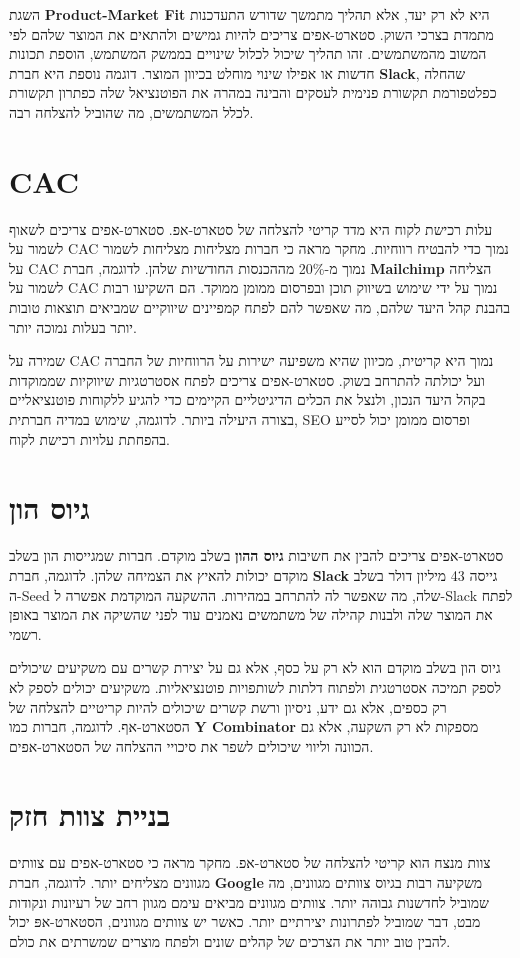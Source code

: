השגת \textbf{Product-Market Fit} היא לא רק יעד, אלא תהליך מתמשך שדורש התעדכנות מתמדת בצרכי השוק. סטארט-אפים צריכים להיות גמישים ולהתאים את המוצר שלהם לפי המשוב מהמשתמשים. זהו תהליך שיכול לכלול שינויים בממשק המשתמש, הוספת תכונות חדשות או אפילו שינוי מוחלט בכיוון המוצר. דוגמה נוספת היא חברת \textbf{Slack}, שהחלה כפלטפורמת תקשורת פנימית לעסקים והבינה במהרה את הפוטנציאל שלה כפתרון תקשורת לכלל המשתמשים, מה שהוביל להצלחה רבה.

\section{CAC \texorpdfstring{}{(Customer Acquisition Cost)}}
עלות רכישת לקוח  היא מדד קריטי להצלחה של סטארט-אפ. סטארט-אפים צריכים לשאוף לשמור על CAC נמוך כדי להבטיח רווחיות. מחקר מראה כי חברות מצליחות מצליחות לשמור על CAC נמוך מ-20\% מההכנסות החודשיות שלהן. לדוגמה, חברת \textbf{Mailchimp} הצליחה לשמור על CAC נמוך על ידי שימוש בשיווק תוכן ובפרסום ממומן ממוקד. הם השקיעו רבות בהבנת קהל היעד שלהם, מה שאפשר להם לפתח קמפיינים שיווקיים שמביאים תוצאות טובות יותר בעלות נמוכה יותר.

שמירה על CAC נמוך היא קריטית, מכיוון שהיא משפיעה ישירות על הרווחיות של החברה ועל יכולתה להתרחב בשוק. סטארט-אפים צריכים לפתח אסטרטגיות שיווקיות שממוקדות בקהל היעד הנכון, ולנצל את הכלים הדיגיטליים הקיימים כדי להגיע ללקוחות פוטנציאליים בצורה היעילה ביותר. לדוגמה, שימוש במדיה חברתית, SEO ופרסום ממומן יכול לסייע בהפחתת עלויות רכישת לקוח.

\section{גיוס הון}
סטארט-אפים צריכים להבין את חשיבות \textbf{גיוס ההון} בשלב מוקדם. חברות שמגייסות הון בשלב מוקדם יכולות להאיץ את הצמיחה שלהן. לדוגמה, חברת \textbf{Slack} גייסה 43 מיליון דולר בשלב ה-Seed שלה, מה שאפשר לה להתרחב במהירות. ההשקעה המוקדמת אפשרה ל-Slack לפתח את המוצר שלה ולבנות קהילה של משתמשים נאמנים עוד לפני שהשיקה את המוצר באופן רשמי.

גיוס הון בשלב מוקדם הוא לא רק על כסף, אלא גם על יצירת קשרים עם משקיעים שיכולים לספק תמיכה אסטרטגית ולפתוח דלתות לשותפויות פוטנציאליות. משקיעים יכולים לספק לא רק כספים, אלא גם ידע, ניסיון ורשת קשרים שיכולים להיות קריטיים להצלחה של הסטארט-אף. לדוגמה, חברות כמו \textbf{Y Combinator} מספקות לא רק השקעה, אלא גם הכוונה וליווי שיכולים לשפר את סיכויי ההצלחה של הסטארט-אפים.

\section{בניית צוות חזק}
צוות מנצח הוא קריטי להצלחה של סטארט-אפ. מחקר מראה כי סטארט-אפים עם צוותים מגוונים מצליחים יותר. לדוגמה, חברת \textbf{Google} משקיעה רבות בגיוס צוותים מגוונים, מה שמוביל לחדשנות גבוהה יותר. צוותים מגוונים מביאים עימם מגוון רחב של רעיונות ונקודות מבט, דבר שמוביל לפתרונות יצירתיים יותר. כאשר יש צוותים מגוונים, הסטארט-אפּ יכול להבין טוב יותר את הצרכים של קהלים שונים ולפתח מוצרים שמשרתים את כולם.

